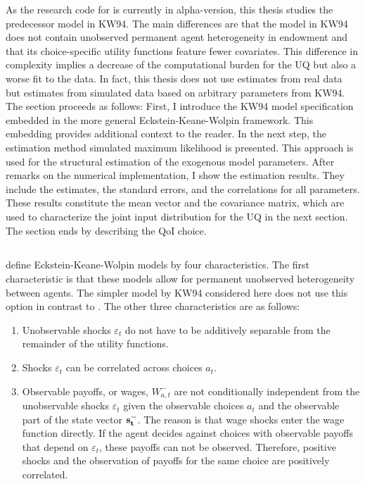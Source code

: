 \documentclass[a4paper,12pt]{article}
\begin{document}
\newline
As the research code for \cite{Keane.1997} is currently in alpha-version, this thesis studies the predecessor model in KW94. The main differences are that the model in KW94 does not contain unobserved permanent agent heterogeneity in endowment and that its choice-specific utility functions feature fewer covariates. This difference in complexity implies a decrease of the computational burden for the UQ but also a worse fit to the data. In fact, this thesis does not use estimates from real data but estimates from simulated data based on arbitrary parameters from KW94.\\
\newline
The section proceeds as follows: First, I introduce the  KW94 model specification embedded in the more general Eckstein-Keane-Wolpin framework. This embedding provides additional context to the reader. In the next step, the estimation method simulated maximum likelihood is presented. This approach is used for the structural estimation of the exogenous model parameters. After remarks on the numerical implementation, I show the estimation results. They include the estimates, the standard errors, and the correlations for all parameters. These results constitute the mean vector and the covariance matrix, which are used to characterize the joint input distribution for the UQ in the next section. The section ends by describing the QoI choice.

\subsection{\cite{Keane.1994}}

\cite{Aguirregabiria.2010} define Eckstein-Keane-Wolpin models by four characteristics. The first characteristic is that these models allow for permanent unobserved heterogeneity between agents. The simpler model by KW94 considered here does not use this option in contrast to \cite{Keane.1997}. The other three characteristics are as follows:
\begin{enumerate}
	\item Unobservable shocks $\varepsilon_t$ do not have to be additively separable from the remainder of the utility functions.
	\item Shocks $\varepsilon_t$ can be correlated across choices $a_t$.
	\item Observable payoffs, or wages, $W_{a,t}^{-}$ are not conditionally independent from the unobservable shocks $\varepsilon_t$ given the observable choices $a_t$ and the observable part of the state vector $\bold{s_t^-}$. The reason is that wage shocks enter the wage function directly. If the agent decides against choices with observable payoffs that depend on $\varepsilon_t$, these payoffs can not be observed. Therefore, positive shocks and the observation of payoffs for the same choice are positively correlated.
\end{enumerate}
\end{document}

